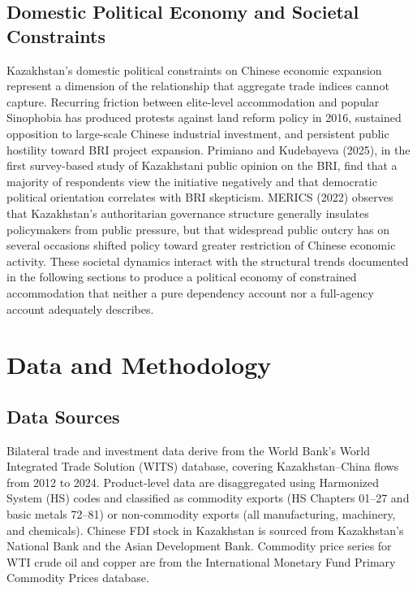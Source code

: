\documentclass[12pt]{article}
\begin{document}
\subsection{Domestic Political Economy and Societal Constraints}

Kazakhstan's domestic political constraints on Chinese economic expansion represent a dimension of the relationship that aggregate trade indices cannot capture. Recurring friction between elite-level accommodation and popular Sinophobia has produced protests against land reform policy in 2016, sustained opposition to large-scale Chinese industrial investment, and persistent public hostility toward BRI project expansion. Primiano and Kudebayeva (2025), in the first survey-based study of Kazakhstani public opinion on the BRI, find that a majority of respondents view the initiative negatively and that democratic political orientation correlates with BRI skepticism. MERICS (2022) observes that Kazakhstan's authoritarian governance structure generally insulates policymakers from public pressure, but that widespread public outcry has on several occasions shifted policy toward greater restriction of Chinese economic activity. These societal dynamics interact with the structural trends documented in the following sections to produce a political economy of constrained accommodation that neither a pure dependency account nor a full-agency account adequately describes.

\section{Data and Methodology}

\subsection{Data Sources}

Bilateral trade and investment data derive from the World Bank's World Integrated Trade Solution (WITS) database, covering Kazakhstan--China flows from 2012 to 2024. Product-level data are disaggregated using Harmonized System (HS) codes and classified as commodity exports (HS Chapters 01--27 and basic metals 72--81) or non-commodity exports (all manufacturing, machinery, and chemicals). Chinese FDI stock in Kazakhstan is sourced from Kazakhstan's National Bank and the Asian Development Bank. Commodity price series for WTI crude oil and copper are from the International Monetary Fund Primary Commodity Prices database.
\end{document}
